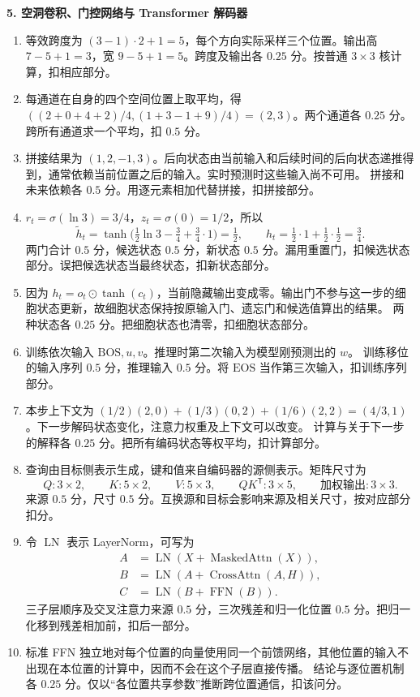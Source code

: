\noindent\textbf{5. 空洞卷积、门控网络与 Transformer 解码器}

\begin{enumerate}[label=(\arabic*)]
\item 等效跨度为 $(3-1)\cdot2+1=5$，每个方向实际采样三个位置。输出高 $7-5+1=3$，宽 $9-5+1=5$。跨度及输出各 $0.25$ 分。按普通 $3\times3$ 核计算，扣相应部分。
\item 每通道在自身的四个空间位置上取平均，得 $((2+0+4+2)/4,(1+3-1+9)/4)=(2,3)$。两个通道各 $0.25$ 分。跨所有通道求一个平均，扣 $0.5$ 分。
\item 拼接结果为 $(1,2,-1,3)$。后向状态由当前输入和后续时间的后向状态递推得到，通常依赖当前位置之后的输入。实时预测时这些输入尚不可用。
拼接和未来依赖各 $0.5$ 分。用逐元素相加代替拼接，扣拼接部分。
\item $r_t=\sigma(\ln3)=3/4$，$z_t=\sigma(0)=1/2$，所以
\[
\widetilde h_t=\tanh\!\bigl(\tfrac12\ln3-\tfrac34+\tfrac34\cdot1\bigr)=\tfrac12,
\qquad h_t=\tfrac12\cdot1+\tfrac12\cdot\tfrac12=\tfrac34.
\]
两门合计 $0.5$ 分，候选状态 $0.5$ 分，新状态 $0.5$ 分。漏用重置门，扣候选状态部分。误把候选状态当最终状态，扣新状态部分。
\item 因为 $h_t=o_t\odot\tanh(c_t)$，当前隐藏输出变成零。输出门不参与这一步的细胞状态更新，故细胞状态保持按原输入门、遗忘门和候选值算出的结果。
两种状态各 $0.25$ 分。把细胞状态也清零，扣细胞状态部分。
\item 训练依次输入 $\mathrm{BOS},u,v$。推理时第二次输入为模型刚预测出的 $w$。
训练移位的输入序列 $0.5$ 分，推理输入 $0.5$ 分。将 $\mathrm{EOS}$ 当作第三次输入，扣训练序列部分。
\item 本步上下文为 $(1/2)(2,0)+(1/3)(0,2)+(1/6)(2,2)=(4/3,1)$。下一步解码状态变化，注意力权重及上下文可以改变。
计算与关于下一步的解释各 $0.25$ 分。把所有编码状态等权平均，扣计算部分。
\item 查询由目标侧表示生成，键和值来自编码器的源侧表示。矩阵尺寸为
\[
Q:3\times2,\qquad K:5\times2,\qquad V:5\times3,
\qquad QK^{\mathsf T}:3\times5,\qquad \text{加权输出}:3\times3.
\]
来源 $0.5$ 分，尺寸 $0.5$ 分。互换源和目标会影响来源及相关尺寸，按对应部分扣分。
\item 令 $\operatorname{LN}$ 表示 LayerNorm，可写为
\begin{align*}
A&=\operatorname{LN}(X+\operatorname{MaskedAttn}(X)),\\
B&=\operatorname{LN}(A+\operatorname{CrossAttn}(A,H)),\\
C&=\operatorname{LN}(B+\operatorname{FFN}(B)).
\end{align*}
三子层顺序及交叉注意力来源 $0.5$ 分，三次残差和归一化位置 $0.5$ 分。把归一化移到残差相加前，扣后一部分。
\item 标准 FFN 独立地对每个位置的向量使用同一个前馈网络，其他位置的输入不出现在本位置的计算中，因而不会在这个子层直接传播。
结论与逐位置机制各 $0.25$ 分。仅以“各位置共享参数”推断跨位置通信，扣该问分。
\end{enumerate}

